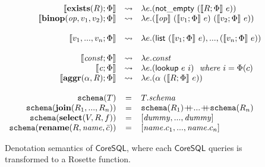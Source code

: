 \begin{figure}[ht]
\[\begin{array}{rcl}
\llbracket\mathbf{exists}(R);\Phi \rrbracket &\leadsto& \lambda e. (\mathsf{not\_empty}~(\llbracket R;\Phi \rrbracket~e))\\
\llbracket \mathbf{binop}(\mathit{op}, v_1, v_2);\Phi\rrbracket &\leadsto&  \lambda e.(\llbracket \mathit{op} \rrbracket~(\llbracket v_1;\Phi \rrbracket~e)~(\llbracket v_2;\Phi \rrbracket~e))\\
\\
 \llbracket v_1,...,v_n;\Phi \rrbracket & \leadsto &\lambda e. (\mathsf{list}~(\llbracket v_1;\Phi\rrbracket~e),...,(\llbracket v_n;\Phi\rrbracket~e)) \\
 \\
\llbracket \mathit{const};\Phi \rrbracket & \leadsto & \lambda e.\mathit{const}\\
\llbracket \mathit{c};\Phi \rrbracket & \leadsto & \lambda e. (\mathsf{lookup}~e~i)~~\textit{where $i=\Phi(c)$}\\
\llbracket \mathbf{aggr}(\alpha, R);\Phi \rrbracket & \leadsto & \lambda e.(\alpha~(\llbracket R;\Phi\rrbracket~e))\\
\\
\mathtt{schema}(T) & = & T.\mathit{schema}\\
\mathtt{schema}(\mathbf{join}(R_1,...,R_n)) & = & \mathtt{schema}( R_1) \concat ...\concat \mathtt{schema}(R_n)\\
\mathtt{schema}(\mathbf{select}(V, R, f))&=& [\mathit{dummy},...,\mathit{dummy}]\\
\mathtt{schema}(\mathbf{rename}(R, \mathit{name}, \bar{c})) &=& [\mathit{name}.c_1,...,\mathit{name}.c_n]\\
\end{array}
\]
\caption{Denotation semantics of $\mathsf{CoreSQL}$, where each $\mathsf{CoreSQL}$ queries is transformed to a Rosette function.}
\label{fig:denotation}
\end{figure}
